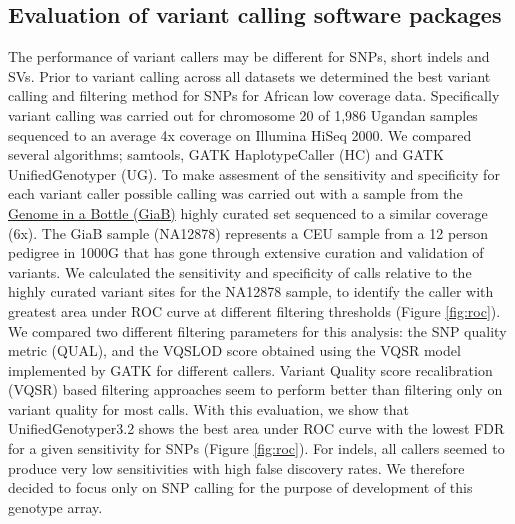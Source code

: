 \subsection{Evaluation of variant calling software packages}
The performance of variant callers may be different for SNPs, short indels and SVs. Prior to variant calling across all datasets we determined the best variant calling and filtering method for SNPs for African low coverage data. Specifically variant calling was carried out for chromosome 20 of 1,986 Ugandan samples sequenced to an average 4x coverage on Illumina HiSeq 2000. We compared several algorithms; samtools, GATK HaplotypeCaller (HC) and GATK UnifiedGenotyper (UG). To make assesment of the sensitivity and specificity for each variant caller possible calling was carried out with a sample from the \href{http://genomeinabottle.org}{Genome in a Bottle (GiaB)} highly curated set sequenced to a similar coverage (6x). The GiaB sample (NA12878) represents a CEU sample from a 12 person pedigree in 1000G that has gone through extensive curation and validation of variants.\cite{Zook2014}
We calculated the sensitivity and specificity of calls relative to the highly curated variant sites for the NA12878 sample, to identify the caller with greatest area under ROC curve at different filtering thresholds (Figure \ref{fig:roc}). We compared two different filtering parameters for this analysis: the SNP quality metric (QUAL), and the VQSLOD score obtained using the VQSR model implemented by GATK for different callers. Variant Quality score recalibration (VQSR) based filtering approaches seem to perform better than filtering only on variant quality for most calls. With this evaluation, we show that UnifiedGenotyper3.2 shows the best area under ROC curve with the lowest FDR for a given sensitivity for SNPs (Figure \ref{fig:roc}). %
For indels, all callers seemed to produce very low sensitivities with high false discovery rates. We therefore decided to focus only on SNP calling for the purpose of development of this genotype array.


